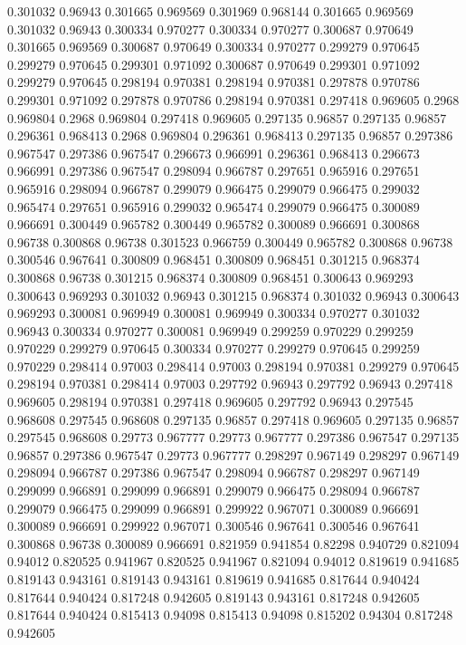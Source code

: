 0.301032 0.96943
0.301665 0.969569
0.301969 0.968144
0.301665 0.969569
0.301032 0.96943
0.300334 0.970277
0.300334 0.970277
0.300687 0.970649
0.301665 0.969569
0.300687 0.970649
0.300334 0.970277
0.299279 0.970645
0.299279 0.970645
0.299301 0.971092
0.300687 0.970649
0.299301 0.971092
0.299279 0.970645
0.298194 0.970381
0.298194 0.970381
0.297878 0.970786
0.299301 0.971092
0.297878 0.970786
0.298194 0.970381
0.297418 0.969605
0.2968 0.969804
0.2968 0.969804
0.297418 0.969605
0.297135 0.96857
0.297135 0.96857
0.296361 0.968413
0.2968 0.969804
0.296361 0.968413
0.297135 0.96857
0.297386 0.967547
0.297386 0.967547
0.296673 0.966991
0.296361 0.968413
0.296673 0.966991
0.297386 0.967547
0.298094 0.966787
0.297651 0.965916
0.297651 0.965916
0.298094 0.966787
0.299079 0.966475
0.299079 0.966475
0.299032 0.965474
0.297651 0.965916
0.299032 0.965474
0.299079 0.966475
0.300089 0.966691
0.300449 0.965782
0.300449 0.965782
0.300089 0.966691
0.300868 0.96738
0.300868 0.96738
0.301523 0.966759
0.300449 0.965782
0.300868 0.96738
0.300546 0.967641
0.300809 0.968451
0.300809 0.968451
0.301215 0.968374
0.300868 0.96738
0.301215 0.968374
0.300809 0.968451
0.300643 0.969293
0.300643 0.969293
0.301032 0.96943
0.301215 0.968374
0.301032 0.96943
0.300643 0.969293
0.300081 0.969949
0.300081 0.969949
0.300334 0.970277
0.301032 0.96943
0.300334 0.970277
0.300081 0.969949
0.299259 0.970229
0.299259 0.970229
0.299279 0.970645
0.300334 0.970277
0.299279 0.970645
0.299259 0.970229
0.298414 0.97003
0.298414 0.97003
0.298194 0.970381
0.299279 0.970645
0.298194 0.970381
0.298414 0.97003
0.297792 0.96943
0.297792 0.96943
0.297418 0.969605
0.298194 0.970381
0.297418 0.969605
0.297792 0.96943
0.297545 0.968608
0.297545 0.968608
0.297135 0.96857
0.297418 0.969605
0.297135 0.96857
0.297545 0.968608
0.29773 0.967777
0.29773 0.967777
0.297386 0.967547
0.297135 0.96857
0.297386 0.967547
0.29773 0.967777
0.298297 0.967149
0.298297 0.967149
0.298094 0.966787
0.297386 0.967547
0.298094 0.966787
0.298297 0.967149
0.299099 0.966891
0.299099 0.966891
0.299079 0.966475
0.298094 0.966787
0.299079 0.966475
0.299099 0.966891
0.299922 0.967071
0.300089 0.966691
0.300089 0.966691
0.299922 0.967071
0.300546 0.967641
0.300546 0.967641
0.300868 0.96738
0.300089 0.966691
0.821959 0.941854
0.82298 0.940729
0.821094 0.94012
0.820525 0.941967
0.820525 0.941967
0.821094 0.94012
0.819619 0.941685
0.819143 0.943161
0.819143 0.943161
0.819619 0.941685
0.817644 0.940424
0.817644 0.940424
0.817248 0.942605
0.819143 0.943161
0.817248 0.942605
0.817644 0.940424
0.815413 0.94098
0.815413 0.94098
0.815202 0.94304
0.817248 0.942605
